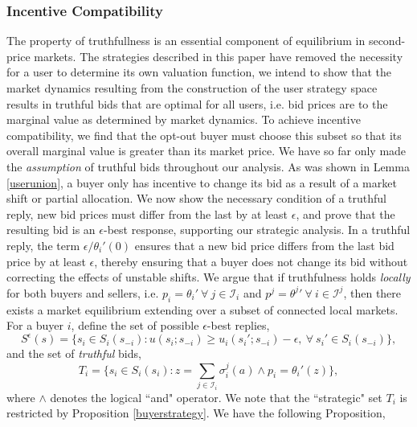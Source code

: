 \documentclass[sigconf, anonymous]{acmart}
\newcommand{\mcI}{\mathcal{I}}
\newcommand{\g}{\sigma}
\theoremstyle{definition}
\begin{document}
\subsubsection{Incentive Compatibility}

The property of truthfullness is an essential component of equilibrium in
second-price markets. The strategies described in this paper have removed the
necessity for a user to determine its own valuation function, we intend to show that the market dynamics resulting from the
construction of the user strategy space results in truthful bids that are optimal for all users,
i.e. bid prices are to the marginal value as determined by market dynamics. 
To achieve incentive compatibility, we find that the opt-out buyer must choose
this subset so that its overall marginal value is greater than its market price.
We have so far only made the \emph{assumption} of truthful bids throughout our analysis. As was shown in Lemma \ref{userunion}, a buyer only
has incentive to change its bid as a result of a market shift or partial
allocation. We now show the necessary condition of a truthful reply, new bid
prices must differ from the last by at least $\epsilon$, and prove that the
resulting bid is an $\epsilon$-best response, supporting our strategic analysis.
In a truthful reply, the term $\epsilon/\theta_i'(0)$
ensures that a new bid price differs from the last bid price by at least
$\epsilon$, thereby ensuring that a buyer does not change its bid without
correcting the effects of unstable shifts.
We argue that if truthfulness holds \emph{locally} for both buyers and sellers, i.e. $p_i ={\theta_i}' \
\forall \ j \in \mcI_i$ and $p^j = {\theta^j}' \ \forall \ i \in\mcI^j$, then
there exists a market equilibrium extending over a subset of connected
local markets. 
For a buyer $i$, define the set of possible $\epsilon$-best replies,
\begin{equation}\label{e-bid}
    S^\epsilon(s) = \lbrace s_i\in S_i(s_{-i}) : u(s_i;s_{-i}) \ge
u_i(s_i';s_{-i}) -\epsilon, \ \forall \ s_i'\in S_i(s_{-i})\rbrace,
\end{equation}
and the set of \emph{truthful} bids, 
\begin{equation}\label{t-bid}
    T_i = \lbrace s_i\in S_i(s_i) : z=\displaystyle\sum_{j\in\mcI_i} \g_i^j(a)
\wedge p_i = \theta_i'(z)\rbrace,
\end{equation}
where $\wedge$ denotes the logical ``and" operator. We note that the ``strategic" set $T_i$
is restricted by Proposition \ref{buyerstrategy}.
We have the following Proposition, 
\end{document}
